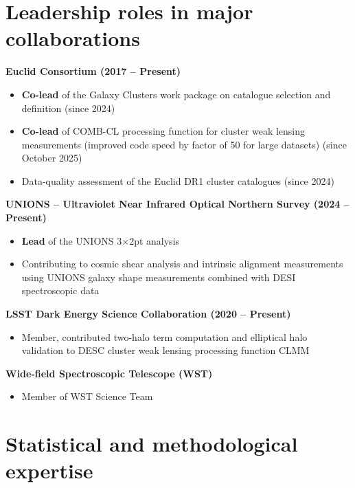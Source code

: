 \documentclass[11pt]{article}
\begin{document}
\section*{Leadership roles in major collaborations}

\textbf{Euclid Consortium (2017 -- Present)}
\begin{itemize}[leftmargin=1.5em, itemsep=0.2em]
\item \textbf{Co-lead} of the Galaxy Clusters work package on catalogue selection and definition (since 2024)
\item \textbf{Co-lead} of COMB-CL processing function for cluster weak lensing measurements (improved code speed by factor of 50 for large datasets) (since October 2025)
\item Data-quality assessment of the Euclid DR1 cluster catalogues (since 2024)
\end{itemize}

\textbf{UNIONS -- Ultraviolet Near Infrared Optical Northern Survey (2024 -- Present)}
\begin{itemize}[leftmargin=1.5em, itemsep=0.2em]
\item \textbf{Lead} of the UNIONS 3$\times$2pt analysis
\item Contributing to cosmic shear analysis and intrinsic alignment measurements using UNIONS galaxy shape measurements combined with DESI spectroscopic data
\end{itemize}

\textbf{LSST Dark Energy Science Collaboration (2020 -- Present)}
\begin{itemize}[leftmargin=1.5em, itemsep=0.2em]
\item Member, contributed two-halo term computation and elliptical halo validation to DESC cluster weak lensing processing function CLMM
\end{itemize}

\textbf{Wide-field Spectroscopic Telescope (WST)}
\begin{itemize}[leftmargin=1.5em, itemsep=0.2em]
\item Member of WST Science Team
\end{itemize}

\section*{Statistical and methodological expertise}
\end{document}
